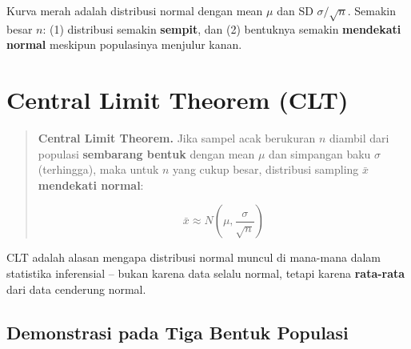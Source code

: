 \documentclass[
  indonesian,
  letterpaper,
]{book}
\begin{document}
Kurva merah adalah distribusi normal dengan mean \(\mu\) dan SD
\(\sigma/\sqrt{n}\). Semakin besar \(n\): (1) distribusi semakin
\textbf{sempit}, dan (2) bentuknya semakin \textbf{mendekati normal}
meskipun populasinya menjulur kanan.

\section{Central Limit Theorem (CLT)}\label{central-limit-theorem-clt}

\begin{quote}
\textbf{Central Limit Theorem.} Jika sampel acak berukuran \(n\) diambil
dari populasi \textbf{sembarang bentuk} dengan mean \(\mu\) dan
simpangan baku \(\sigma\) (terhingga), maka untuk \(n\) yang cukup
besar, distribusi sampling \(\bar{x}\) \textbf{mendekati normal}:

\[\bar{x} \approx N\left(\mu, \frac{\sigma}{\sqrt{n}}\right)\]
\end{quote}

CLT adalah alasan mengapa distribusi normal muncul di mana-mana dalam
statistika inferensial -- bukan karena data selalu normal, tetapi karena
\textbf{rata-rata} dari data cenderung normal.

\subsection{Demonstrasi pada Tiga Bentuk
Populasi}\label{demonstrasi-pada-tiga-bentuk-populasi}
\end{document}
